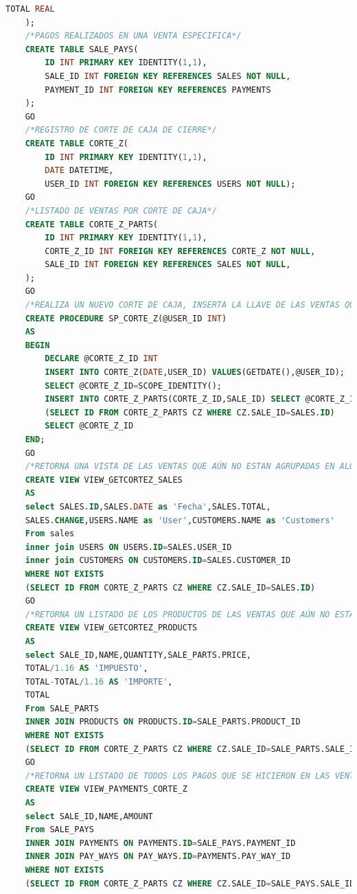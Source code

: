 \documentclass[a4paper,DIV=12]{scrreprt}
\begin{document}
\begin{lstlisting}[language={SQL}]
        TOTAL REAL
    );
    /*PAGOS REALIZADOS EN UNA VENTA ESPECIFICA*/
    CREATE TABLE SALE_PAYS(
        ID INT PRIMARY KEY IDENTITY(1,1),
        SALE_ID INT FOREIGN KEY REFERENCES SALES NOT NULL,
        PAYMENT_ID INT FOREIGN KEY REFERENCES PAYMENTS
    );
    GO
    /*REGISTRO DE CORTE DE CAJA DE CIERRE*/
    CREATE TABLE CORTE_Z(
        ID INT PRIMARY KEY IDENTITY(1,1),
        DATE DATETIME,
        USER_ID INT FOREIGN KEY REFERENCES USERS NOT NULL);
    GO
    /*LISTADO DE VENTAS POR CORTE DE CAJA*/
    CREATE TABLE CORTE_Z_PARTS(
        ID INT PRIMARY KEY IDENTITY(1,1),
        CORTE_Z_ID INT FOREIGN KEY REFERENCES CORTE_Z NOT NULL,
        SALE_ID INT FOREIGN KEY REFERENCES SALES NOT NULL,
    );
    GO
    /*REALIZA UN NUEVO CORTE DE CAJA, INSERTA LA LLAVE DE LAS VENTAS QUE PARTICIPAN EN ESTE CORTE*/
    CREATE PROCEDURE SP_CORTE_Z(@USER_ID INT)
    AS
    BEGIN
        DECLARE @CORTE_Z_ID INT
        INSERT INTO CORTE_Z(DATE,USER_ID) VALUES(GETDATE(),@USER_ID);
        SELECT @CORTE_Z_ID=SCOPE_IDENTITY();
        INSERT INTO CORTE_Z_PARTS(CORTE_Z_ID,SALE_ID) SELECT @CORTE_Z_ID,ID FROM SALES WHERE NOT EXISTS 
        (SELECT ID FROM CORTE_Z_PARTS CZ WHERE CZ.SALE_ID=SALES.ID)
        SELECT @CORTE_Z_ID
    END;
    GO
    /*RETORNA UNA VISTA DE LAS VENTAS QUE AÚN NO ESTAN AGRUPADAS EN ALGÚN CORTE DE CAJA*/
    CREATE VIEW VIEW_GETCORTEZ_SALES
    AS
    select SALES.ID,SALES.DATE as 'Fecha',SALES.TOTAL,
    SALES.CHANGE,USERS.NAME as 'User',CUSTOMERS.NAME as 'Customers' 
    From sales
    inner join USERS ON USERS.ID=SALES.USER_ID
    inner join CUSTOMERS ON CUSTOMERS.ID=SALES.CUSTOMER_ID
    WHERE NOT EXISTS 
    (SELECT ID FROM CORTE_Z_PARTS CZ WHERE CZ.SALE_ID=SALES.ID)
    GO
    /*RETORNA UN LISTADO DE LOS PRODUCTOS DE LAS VENTAS QUE AÚN NO ESTAN AGRUPADAS EN ALGÚN CORTE DE CAJA*/
    CREATE VIEW VIEW_GETCORTEZ_PRODUCTS
    AS
    select SALE_ID,NAME,QUANTITY,SALE_PARTS.PRICE,
    TOTAL/1.16 AS 'IMPUESTO',
    TOTAL-TOTAL/1.16 AS 'IMPORTE',
    TOTAL
    From SALE_PARTS
    INNER JOIN PRODUCTS ON PRODUCTS.ID=SALE_PARTS.PRODUCT_ID
    WHERE NOT EXISTS 
    (SELECT ID FROM CORTE_Z_PARTS CZ WHERE CZ.SALE_ID=SALE_PARTS.SALE_ID)
    GO
    /*RETORNA UN LISTADO DE TODOS LOS PAGOS QUE SE HICIERON EN LAS VENTAS QUE AÚN NO ESTAN AGRUPADAS EN ALGÚN CORTE DE CAJA*/
    CREATE VIEW VIEW_PAYMENTS_CORTE_Z
    AS
    select SALE_ID,NAME,AMOUNT
    From SALE_PAYS
    INNER JOIN PAYMENTS ON PAYMENTS.ID=SALE_PAYS.PAYMENT_ID
    INNER JOIN PAY_WAYS ON PAY_WAYS.ID=PAYMENTS.PAY_WAY_ID
    WHERE NOT EXISTS 
    (SELECT ID FROM CORTE_Z_PARTS CZ WHERE CZ.SALE_ID=SALE_PAYS.SALE_ID)

\end{lstlisting}
\end{document}
